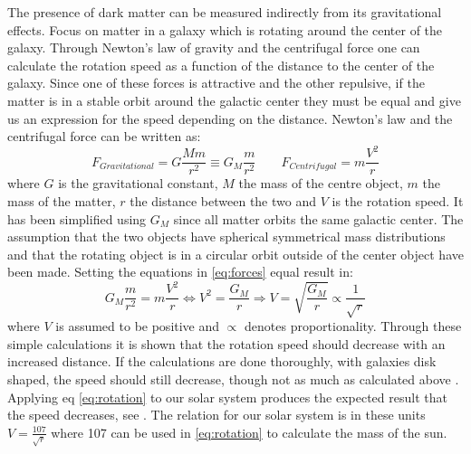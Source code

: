 The presence of dark matter can be measured indirectly from its gravitational effects. Focus on matter in a galaxy which is rotating around the center of the galaxy. Through Newton's law of gravity and the centrifugal force one can calculate the rotation speed as a function of the distance to the center of the galaxy. Since one of these forces is attractive and the other repulsive, if the matter is in a stable orbit around the galactic center they must be equal and give us an expression for the speed depending on the distance. Newton's law and the centrifugal force can be written as:
\begin{equation}\label{eq:forces}
F_{Gravitational}=G \frac{M m}{r^2} \equiv G_M \frac{m}{r^2} \qquad F_{Centrifugal} = m\frac{V^2}{r}
\end{equation}
where $G$ is the gravitational constant, $M$ the mass of the centre object, $m$ the mass of the matter, $r$ the distance between the two and $V$ is the rotation speed. It has been simplified using $G_M$ since all matter orbits the same galactic center. The assumption that the two objects have spherical symmetrical mass distributions and that the rotating object is in a circular orbit outside of the center object have been made. Setting the equations in \eqref{eq:forces} equal result in:
\begin{equation}\label{eq:rotation}
G_M \frac{m}{r^2} = m\frac{V^2}{r} \Leftrightarrow V^2 =\frac{G_M}{r} \Rightarrow V=\sqrt{\frac{G_M}{r}} \propto \frac{1}{\sqrt{r}}
\end{equation}
where $V$ is assumed to be positive and $\propto$ denotes proportionality. Through these simple calculations it is shown that the rotation speed should decrease with an increased distance. If the calculations are done thoroughly, with galaxies disk shaped, the speed should still decrease, though not as much as calculated above \citep{Albada:1985}. Applying eq \eqref{eq:rotation} to our solar system produces the expected result that the speed decreases, see . The relation for our solar system is in these units $V=\frac{107}{\sqrt{r}}$ where 107 can be used in \eqref{eq:rotation} to calculate the mass of the sun.

